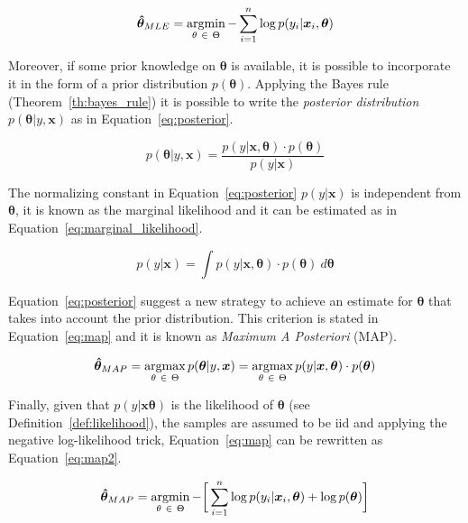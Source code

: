 \begin{equation} \label{eq:nll}
	\bm{\hat \theta}_{MLE} = \mathop{\mathrm{argmin}}\limits_{\theta~\in~\Theta} - \sum_{i=1}^n \log p(y_i | \bm{x}_i, \bm{\theta})
\end{equation}

Moreover, if some prior knowledge on $\bm{\theta}$ is available, it is possible to incorporate it in the form of a prior distribution $p(\bm{\theta})$. Applying the Bayes rule (Theorem~\ref{th:bayes_rule}) it is possible to write the \textit{posterior distribution} $p(\bm{\theta}|y,\bm{x})$ as in Equation~\eqref{eq:posterior}.

\begin{equation} \label{eq:posterior}
	p(\bm{\theta}|y,\bm{x}) = \frac{p(y|\bm{x}, \bm{\theta}) \cdot p(\bm{\theta})}{p(y|\bm{x})}
\end{equation}

The normalizing constant in Equation~\eqref{eq:posterior} $p(y|\bm{x})$ is independent from $\bm{\theta}$, it is known as the marginal likelihood and it can be estimated as in Equation~\eqref{eq:marginal_likelihood}.

\begin{equation} \label{eq:marginal_likelihood}
	p(y|\bm{x}) = \int p(y|\bm{x}, \bm{\theta}) \cdot p(\bm{\theta})~d\bm{\theta}
\end{equation}

Equation~\eqref{eq:posterior} suggest a new strategy to achieve an estimate for $\bm{\theta}$ that takes into account the prior distribution. This criterion is stated in Equation~\eqref{eq:map} and it is known as \textit{Maximum A Posteriori} (MAP).

\begin{equation} \label{eq:map}
	\bm{\hat \theta}_{MAP} = \mathop{\mathrm{argmax}}\limits_{\theta~\in~\Theta} p(\bm{\theta}|y,\bm{x}) = \mathop{\mathrm{argmax}}\limits_{\theta~\in~\Theta} p(y|\bm{x}, \bm{\theta}) \cdot p(\bm{\theta})
\end{equation}

Finally, given that
$p(y|\bm{x} \bm{\theta})$ is the likelihood of $\bm{\theta}$ (see Definition~\ref{def:likelihood}),
the samples are assumed to be \ac{iid} and
applying the negative log-likelihood trick,
Equation~\eqref{eq:map} can be rewritten as Equation~\eqref{eq:map2}.

\begin{equation} \label{eq:map2}
	\bm{\hat \theta}_{MAP} = \mathop{\mathrm{argmin}}\limits_{\theta~\in~\Theta} - \bigg[\sum_{i=1}^n \log p(y_i|\bm{x}_i,\bm{\theta})  + \log p(\bm{\theta})\bigg]
\end{equation}

